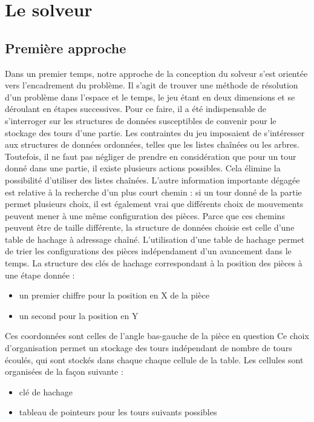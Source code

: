 \documentclass{report}
\begin{document}
\chapter{Le solveur}
\setcounter{section}{0}
\section{Première approche}
Dans un premier temps, notre approche de la conception du solveur s'est orientée vers l'encadrement du problème.
Il s'agit de trouver une méthode de résolution d'un problème dans l'espace et le temps, le jeu étant en deux dimensions et se déroulant en étapes successives.
Pour ce faire, il a été indispensable de s'interroger sur les structures de données susceptibles de convenir pour le stockage des tours d'une partie.
Les contraintes du jeu imposaient de s'intéresser aux structures de données ordonnées, telles que les listes chaînées ou les arbres.
Toutefois, il ne faut pas négliger de prendre en considération que pour un tour donné dans une partie, il existe plusieurs actions possibles.
Cela élimine la possibilité d'utiliser des listes chaînées.
L'autre information importante dégagée est relative à la recherche d'un plus court chemin : si un tour donné de la partie permet plusieurs choix, il est également vrai que différents choix de mouvements peuvent mener à une même configuration des pièces.
Parce que ces chemins peuvent être de taille différente, la structure de données choisie est celle d'une table de hachage à adressage chaîné.
L'utilisation d'une table de hachage permet de trier les configurations des pièces indépendament d'un avancement dans le temps.
La structure des clés de hachage correspondant à la position des pièces à une étape donnée :
\begin{itemize}
\item un premier chiffre pour la position en X de la pièce 
\item un second pour la position en Y 
\end{itemize}
Ces coordonnées sont celles de l'angle bas-gauche de la pièce en question
Ce choix d'organisation permet un stockage des tours indépendant de nombre de tours écoulés, qui sont stockés dans chaque chaque cellule de la table.
Les cellules sont organisées de la façon suivante :
\begin{itemize}
\item clé de hachage
\item tableau de pointeurs pour les tours suivants possibles
\end{itemize}
\end{document}
